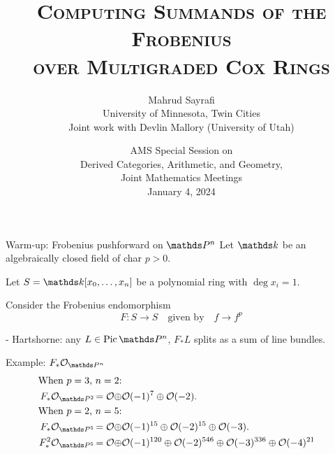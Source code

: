 \documentclass[beamer]{paper}
\newcommand{\lc}{\MakeLowercase}
\begin{document}
\rmfamily
{}

\title[Computing summands of the Frobenius over Cox rings]
      {\textsc{Computing Summands of the Frobenius \\ over Multigraded Cox Rings}}



\author[Mahrud Sayrafi]{M\lc{ahrud} S\lc{ayrafi} \\
  {\footnotesize U\lc{niversity} of M\lc{innesota}, T\lc{win} C\lc{ities}} \\[0em]
  {\footnotesize Joint work with Devlin Mallory (University of Utah)}}


\date{{\footnotesize AMS Special Session on \\
    Derived Categories, Arithmetic, and Geometry, \\
    Joint Mathematics Meetings} \\ January 4, 2024}

\frame[plain]{\titlepage}


\begin{frame}[t]{Warm-up: Frobenius pushforward on $\PPn$}
  Let $\kk$ be an algebraically closed field of char $p>0$.

  Let $S = \kk[x_0,\dots,x_n]$ be a polynomial ring with $\deg x_i = 1$.

  \vfill
  Consider the Frobenius endomorphism
  \[ F\colon S\to S \quad \text{given by} \quad f \to f^p \]

  - Hartshorne: any $L\in\Pic\PPn$, $F_*L$ splits as a sum of line bundles.
  \begin{block}{Example: $F_*\o_{\PPn}$}
    \vspace*{-0.2in}
    \begin{align*}
      \text{When $p=3$, $n=2$:} \\
      F_*\o_{\PP2} = \o \oplus &\o(-1)^7 \oplus \o(-2). \\
      \text{When $p=2$, $n=5$:} \\
      F_*\o_{\PP5} = \o \oplus &\o(-1)^{15} \oplus \o(-2)^{15} \oplus \o(-3). \\
      F_*^2\o_{\PP5} = \o \oplus &\o(-1)^{120} \oplus \o(-2)^{546} \oplus \o(-3)^{336} \oplus \o(-4)^{21}
    \end{align*}
  \end{block}
\end{frame}
\end{document}
